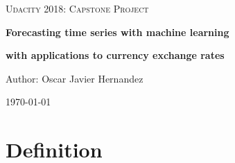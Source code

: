 \documentclass[10pt,a4paper]{article}
\begin{document}

\begin{titlepage}
	\centering
	\vspace{1cm}
	{\scshape\Large Udacity 2018: Capstone Project \par}
	\vspace{1.5cm}
	{\huge\bfseries Forecasting time series with machine learning\par}
	\vspace{1.5cm}
	{\large\bfseries with applications to currency exchange rates \par}
	\vspace{2cm}
	{\Large Author: Oscar Javier Hernandez\par}
	\vfill

	{\large \today\par}
\end{titlepage}

\section{Definition}
\end{document}
